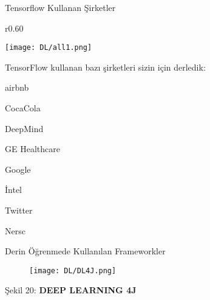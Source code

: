 \documentclass{beamer}                                                                                          %
\begin{document}
    \begin{frame}{\color{myred1} Tensorflow Kullanan Şirketler}
        \begin{wrapfigure}{r}{0.60\textwidth}                   %
        \vspace{-15 pt}                                         %
        \begin{center}                                          %
        \texttt{[image: DL/all1.png]}     %
        \end{center}                                            %
        \vspace{-20pt}                                          %
        \vspace{-10pt}                                          %
        \end{wrapfigure}                                        %
        \color{myred1} TensorFlow kullanan bazı şirketleri sizin için derledik:\par \vspace{15}
	        \color{myred1} \color{black}airbnb \par \vspace{5}
            \color{myred1} \color{black}CocaCola \par \vspace{5}
            \color{myred1} \color{black}DeepMind \par \vspace{5}
            \color{myred1} \color{black}GE Healthcare \par \vspace{5}
            \color{myred1} \color{black}Google \par \vspace{5}
            \color{myred1} \color{black}İntel \par \vspace{5}
            \color{myred1} \color{black}Twitter \par \vspace{5}
            \color{myred1} \color{black}Nersc
    \end{frame}
    
   
    \begin{frame}{Derin Öğrenmede Kullanılan Frameworkler}
	    \begin{figure}
    	    \centering
    	    \texttt{[image: DL/DL4J.png]}
	    \end{figure}
	    \vspace{25} \centering
	    \color{myred1}Şekil 20:\color{black} \textbf{DEEP LEARNING 4J }
    \end{frame}
    
\end{document}
